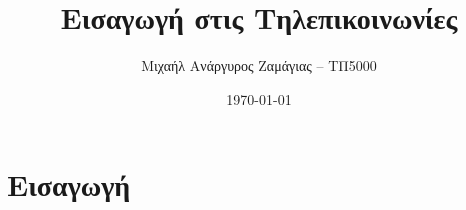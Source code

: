 \documentclass[12pt]{report}
\title{Εισαγωγή στις Τηλεπικοινωνίες}
\author{Μιχαήλ Ανάργυρος Ζαμάγιας -- ΤΠ5000}
\date{\today}
\begin{document}
\maketitle

\tableofcontents
\newpage

\chapter{Εισαγωγή}


\newpage
\end{document}
